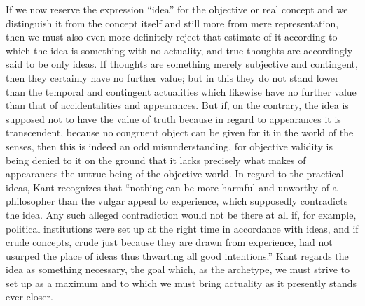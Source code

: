 If we now reserve the expression “idea”
for the objective or real concept
and we distinguish it from the concept itself
and still more from mere representation,
then we must also even more definitely reject
that estimate of it according to which
the idea is something with no actuality,
and true thoughts are accordingly said to be only ideas.
If thoughts are something merely subjective and contingent,
then they certainly have no further value;
but in this they do not stand lower
than the temporal and contingent actualities
which likewise have no further value than
that of accidentalities and appearances.
But if, on the contrary, the idea is
supposed not to have the value of truth
because in regard to appearances it is transcendent,
because no congruent object can be given for it
in the world of the senses,
then this is indeed an odd misunderstanding,
for objective validity is being denied to it
on the ground that it lacks precisely what makes
of appearances the untrue being of the objective world.
In regard to the practical ideas, Kant recognizes that
“nothing can be more harmful and unworthy of
a philosopher than the vulgar appeal to experience,
which supposedly contradicts the idea.
Any such alleged contradiction would not be there at all
if, for example, political institutions were set up
at the right time in accordance with ideas,
and if crude concepts, crude just because they are drawn from experience,
had not usurped the place of ideas thus thwarting all good intentions.”
Kant regards the idea as something necessary,
the goal which, as the archetype,
we must strive to set up as a maximum
and to which we must bring actuality
as it presently stands ever closer.

